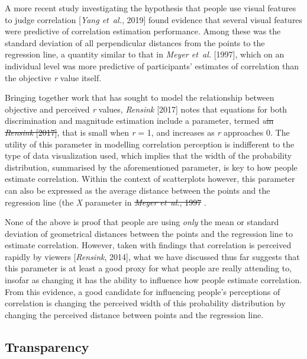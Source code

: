 \documentclass[preprint, 3p,
authoryear]{elsarticle} %
\newcommand{\ldiffentity}[1]{#1}
\providecommand{\DIFaddtex}[1]{{\protect\color{blue}\uwave{#1}}} %
\providecommand{\DIFdeltex}[1]{{\protect\color{red}\sout{#1}}}                      %
\providecommand{\DIFaddbegin}{} %
\providecommand{\DIFaddend}{} %
\providecommand{\DIFdelbegin}{} %
\providecommand{\DIFdelend}{} %
\providecommand{\DIFadd}[1]{\texorpdfstring{\DIFaddtex{#1}}{#1}} %
\providecommand{\DIFdel}[1]{\texorpdfstring{\DIFdeltex{#1}}{}} %
\newcommand{\DIFscaledelfig}{0.5}
\newlength{\DIFdelgraphicswidth} %
\newlength{\DIFdelgraphicsheight} %
\newcommand{\DIFaddincludegraphics}[2][]{{\color{blue}\fbox{\DIFOincludegraphics[#1]{#2}}}} %
\newcommand{\DIFdelincludegraphics}[2][]{%
\sbox{\DIFdelgraphicsbox}{\DIFOincludegraphics[#1]{#2}}%
\settoboxwidth{\DIFdelgraphicswidth}{\DIFdelgraphicsbox} %
\settoboxtotalheight{\DIFdelgraphicsheight}{\DIFdelgraphicsbox} %
\scalebox{\DIFscaledelfig}{%
\parbox[b]{\DIFdelgraphicswidth}{\usebox{\DIFdelgraphicsbox}\\[-\baselineskip] \rule{\DIFdelgraphicswidth}{0em}}\llap{\resizebox{\DIFdelgraphicswidth}{\DIFdelgraphicsheight}{%
\setlength{\unitlength}{\DIFdelgraphicswidth}%
\begin{picture}(1,1)%
\thicklines\linethickness{2pt} %
{\color[rgb]{1,0,0}\put(0,0){\framebox(1,1){}}}%
{\color[rgb]{1,0,0}\put(0,0){\line( 1,1){1}}}%
{\color[rgb]{1,0,0}\put(0,1){\line(1,-1){1}}}%
\end{picture}%
}\hspace*{3pt}}} %
} %
\DeclareRobustCommand{\DIFaddbegin}{\DIFOaddbegin \let\includegraphics\DIFaddincludegraphics} %
\DeclareRobustCommand{\DIFaddend}{\DIFOaddend \let\includegraphics\DIFOincludegraphics} %
\DeclareRobustCommand{\DIFdelbegin}{\DIFOdelbegin \let\includegraphics\DIFdelincludegraphics} %
\DeclareRobustCommand{\DIFdelend}{\DIFOaddend \let\includegraphics\DIFOincludegraphics} %
\begin{document}
A more recent study investigating the hypothesis that people use visual
features to judge correlation [\ldiffentity{\textit{Yang et~al.}, \ldiffentity{2019}}] found evidence that
several visual features were predictive of correlation estimation
performance. Among these was the standard deviation of all perpendicular
distances from the points to the regression line, a quantity similar to
that in \ldiffentity{\textit{Meyer et~al.} [\ldiffentity{1997}]}, which on an individual level was more
predictive of participants' estimates of correlation than the objective
\emph{r} value itself.

Bringing together work that has sought to model the relationship between
objective and perceived \emph{r} values, \ldiffentity{\textit{Rensink} [\ldiffentity{2017}]} notes that
equations for both discrimination and magnitude estimation include a
parameter, termed \emph{u}\DIFdelbegin \DIFdel{in \ldiffentity{\textit{Rensink} [\ldiffentity{2017}]}}\DIFdelend , that is small when \emph{r} = 1, and
increases as \emph{r} approaches 0. The utility of this parameter in
modelling correlation perception is indifferent to the type of data
visualization used, which implies that the width of the probability
distribution, summarised by the aforementioned parameter, is key to how
people estimate correlation. Within the context of scatterplots however,
this parameter can also be expressed as the average distance between the
points and the regression line (the \emph{X} parameter in
\DIFdelbegin %
\DIFdel{\ldiffentity{\textit{Meyer et~al.}, \ldiffentity{1997}}}%
\DIFdelend \DIFaddbegin \DIFadd{\mbox{%
\citealp{meyer_1997}}\hskip0pt%
)}\DIFaddend .

None of the above is proof that people are using \emph{only} the mean or
standard deviation of geometrical distances between the points and the
regression line to estimate correlation. However, taken with findings
that correlation is perceived rapidly by viewers [\ldiffentity{\textit{Rensink}, \ldiffentity{2014}}],
what we have discussed thus far suggests that this parameter is at least
a good proxy for what people are really attending to, insofar as
changing it has the ability to influence how people estimate
correlation. From this evidence, a good candidate for influencing
people's perceptions of correlation is changing the perceived width of
this probability distribution by changing the perceived distance between
points and the regression line.

\DIFdelbegin %
\DIFdelend \DIFaddbegin \hypertarget{transparency}{%
\subsection{Transparency}\label{transparency}}
\DIFaddend 
\end{document}
